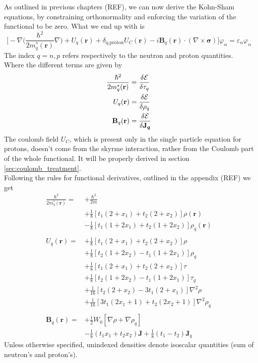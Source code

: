 As outlined in previous chapters (REF), we can now derive the Kohn-Sham equations, by constraining orthonormality and enforcing the variation of the functional to be zero. What we end up with is
\begin{equation}
    \label{eq:spe_ks}
    \bigg[-\nabla\bigg(\frac{\hbar^2}{2m^{*}_q(\mathbf r)}\nabla \bigg) + U_q(\mathbf r) + \delta_{\text{q,proton}}U_C(\mathbf r)-i\mathbf B_q(\mathbf r)\cdot(\nabla \times \boldsymbol\sigma) \bigg]\varphi_\alpha=\varepsilon_\alpha\varphi_\alpha
\end{equation}
The index $q=n,p$ refers respectively to the neutron and proton quantities.
\\Where the different terms are given by
\begin{align}
    \frac{\hbar^2}{2m^{*}_q(\mathbf r)} &= \fdv{\mathcal E}{\tau_q}
    \\U_q(\mathbf r) &= \fdv{\mathcal E}{\rho_q}\label{eq:fdv_rho_skyrme}
    \\\mathbf B_q(\mathbf r) &= \fdv{\mathcal E}{\boldsymbol{\mathbf J_q}}
\end{align}
The coulomb field $U_C$, which is present only in the single particle equation for protons, doesn't come from the skyrme interaction, rather from the Coulomb part of the whole functional. It will be properly derived in section \ref{sec:coulomb_treatment}.
\\Following the rules for functional derivatives, outlined in the appendix (REF) we get
\begin{align}
    \frac{\hbar^2}{2m_q^*(\mathbf r)} =& +\frac{\hbar^2}{2m} \\&+ \frac 1 8 [t_1(2+x_1)+t_2(2+x_2)]\rho(\mathbf r) \\&- \frac 1 8 [t_1(1+2x_1)+t_2(1+2x_2)]\rho_q(\mathbf r ) \\\\
    U_q(\mathbf r) =& +\frac 1 8 [t_1(2+x_1)+t_2(2+x_2)]\rho \\&+ \frac 1 8 [t_2(1+2x_2)-t_1(1+2x_1)]\rho_q \\
    &+ \frac 1 8 [t_1(2+x_1)+t_2(2+x_2)]\tau \\&+ \frac 1 8 [t_2(1+2x_2)-t_1(1+2x_1)]\tau_q \\
    &+ \frac 1 {16} [t_2(2+x_2)-3t_1(2+x_1)] \nabla^2 \rho \\&+ \frac 1 {16} [3t_1(2x_1+1)+t_2(2x_2+1)] \nabla^2 \rho_q \\\\
    \mathbf B_q (\mathbf r ) = &+\frac 1 2 W_0 [\nabla\rho + \nabla \rho_q] \\&-\frac 1 8 (t_1 x_1 + t_2 x_2) \mathbf J + \frac 1 8 (t_1 - t_2) \mathbf J_q 
\end{align}
Unless otherwise specified, unindexed densities denote isoscalar quantities (sum of neutron's and proton's).